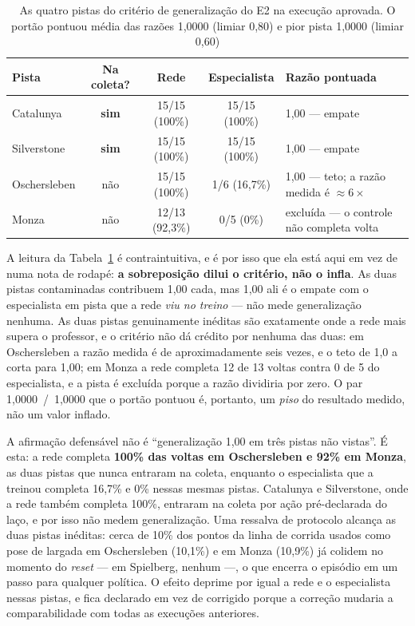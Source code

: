 \begin{table}[h]
    \centering
    \begin{tabular}{|l|c|c|c|p{3.5cm}|}
        \hline
        \textbf{Pista} & \textbf{Na coleta?} & \textbf{Rede} &
        \textbf{Especialista} & \textbf{Razão pontuada} \\
        \hline
        Catalunya    & \textbf{sim} & 15/15 (100\%)  & 15/15 (100\%) &
        1,00 --- empate \\
        \hline
        Silverstone  & \textbf{sim} & 15/15 (100\%)  & 15/15 (100\%) &
        1,00 --- empate \\
        \hline
        Oschersleben & não          & 15/15 (100\%)  & 1/6 (16,7\%)  &
        1,00 --- teto; a razão medida é $\approx 6\times$ \\
        \hline
        Monza        & não          & 12/13 (92,3\%) & 0/5 (0\%)     &
        excluída --- o controle não completa volta \\
        \hline
    \end{tabular}
    \caption{As quatro pistas do critério de generalização do E2 na execução
    aprovada. O portão pontuou média das razões 1,0000 (limiar 0,80) e pior
    pista 1,0000 (limiar 0,60)}
    \label{tab:val_heldout}
\end{table}

A leitura da Tabela~\ref{tab:val_heldout} é contraintuitiva, e é por isso que ela
está aqui em vez de numa nota de rodapé: \textbf{a sobreposição dilui o critério,
não o infla}. As duas pistas contaminadas contribuem 1,00 cada, mas 1,00 ali é o
empate com o especialista em pista que a rede \textit{viu no treino} --- não mede
generalização nenhuma. As duas pistas genuinamente inéditas são exatamente onde a
rede mais supera o professor, e o critério não dá crédito por nenhuma das duas:
em Oschersleben a razão medida é de aproximadamente seis vezes, e o teto de 1,0 a
corta para 1,00; em Monza a rede completa 12 de 13 voltas contra 0 de 5 do
especialista, e a pista é excluída porque a razão dividiria por zero. O par
1,0000~/~1,0000 que o portão pontuou é, portanto, um \textit{piso} do resultado
medido, não um valor inflado.

A afirmação defensável não é ``generalização 1,00 em três pistas não vistas''. É
esta: a rede completa \textbf{100\% das voltas em Oschersleben e 92\% em Monza},
as duas pistas que nunca entraram na coleta, enquanto o especialista que a
treinou completa 16,7\% e 0\% nessas mesmas pistas. Catalunya e Silverstone, onde
a rede também completa 100\%, entraram na coleta por ação pré-declarada do laço,
e por isso não medem generalização. Uma ressalva de protocolo alcança as duas
pistas inéditas: cerca de 10\% dos pontos da linha de corrida usados como pose
de largada em Oschersleben (10,1\%) e em Monza (10,9\%) já colidem no momento
do \textit{reset} --- em Spielberg, nenhum ---, o que encerra o episódio em um
passo para qualquer política. O efeito deprime por igual a rede e o
especialista nessas pistas, e fica declarado em vez de corrigido porque a
correção mudaria a comparabilidade com todas as execuções anteriores.

